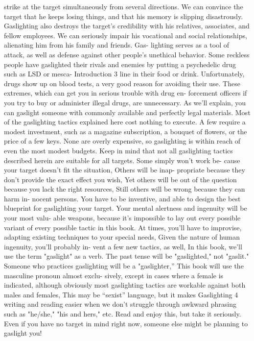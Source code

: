 \documentclass{book}
\begin{document}
strike at the target simultaneously from several directions. We 
can convince the target that he keeps losing things, and that his 
memory is slipping disastrously. Gaslighting also destroys the 
target’s credibility with his relatives, associates, and fellow 
employees. We can seriously impair his vocational and social 
relationships, alienating him from his family and friends. Gas- 
lighting serves as a tool of attack, as well as defense against 
other people's unethical behavior. 
Some reckless people have gaslighted their rivals and 
enemies by putting a psychedelic drug such as LSD or mesca- 
  Introduction 
3 
line in their food or drink. Unfortunately, drugs show up on 
blood tests, a very good reason for avoiding their use. These 
extremes, which can get you in serious trouble with drug en- 
forcement officers if you try to buy or administer illegal drugs, 
are unnecessary. As we'll explain, you can gaslight someone 
with commonly available and perfectly legal materials. 
Most of the gaslighting tactics explained here cost nothing 
to execute. A few require a modest investment, such as a 
magazine subscription, a bouquet of flowers, or the price of a 
few keys. None are overly expensive, so gaslighting is within 
reach of even the most modest budgets. 
Keep in mind that not all gaslighting tactics described 
herein are suitable for all targets. Some simply won't work be- 
cause your target doesn't fit the situation, Others will be inap- 
propriate because they don't provide the exact effect you wish, 
Yet others will be out of the question because you lack the right 
resources, Still others will be wrong because they can harm in- 
nocent persons. You have to be inventive, and able to design 
the best blueprint for gaslighting your target. 
Your mental alertness and ingenuity will be your most valu- 
able weapons, because it's impossible to lay out every possible 
variant of every possible tactic in this book. At times, you'll 
have to improvise, adapting existing techniques to your special 
needs, Given the nature of human ingenuity, you'll probably in- 
vent a few new tactics, as well, 
In this book, we'll use the term "gaslight" as a verb. The 
past tense will be "gaslighted," not "gaslit." Someone who 
practices gaslighting will be a "gaslighter,” 
This book will use the masculine pronoun almost exclu- 
sively, except in cases where a female is indicated, although 
obviously most gaslighting tactics are workable against both 
males and females, This may be “sexist” language, but it makes  Gaslighting 
4 
writing and reading easier when we don't struggle through 
awkward phrasing such as "he/she," "his and hers," etc. 
Read and enjoy this, but take it seriously. Even if you have 
no target in mind right now, someone else might be planning to 
gaslight you! 
  
\end{document}
